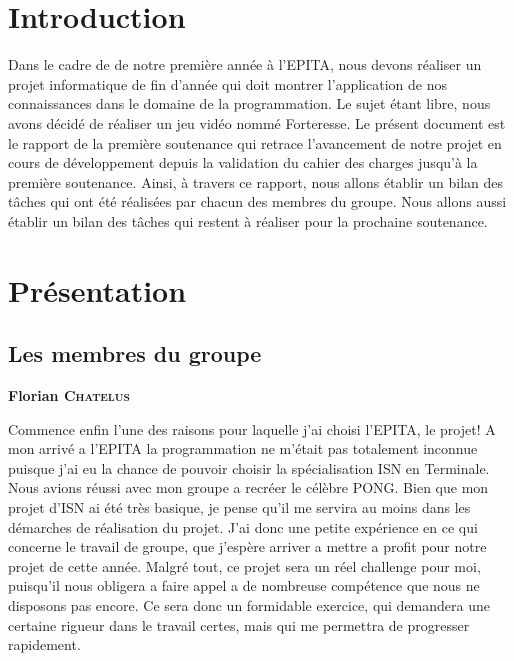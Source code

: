 \documentclass[a4paper, 12pt]{article}
\begin{document}
\begin{spacing}{1.0}
	\tableofcontents
\end{spacing}

\newpage
\section{Introduction}
Dans le cadre de de notre première année à l'EPITA, nous devons réaliser un projet informatique de fin d'année qui doit montrer l'application de nos connaissances dans le domaine de la programmation.
	Le sujet étant libre, nous avons décidé de réaliser un jeu vidéo nommé Forteresse.
	Le présent document est  le rapport de la première soutenance qui retrace l'avancement de notre projet en cours de développement depuis la validation du cahier des charges jusqu'à la première soutenance. Ainsi, à travers ce rapport, nous allons établir un bilan des tâches qui ont été réalisées par chacun des membres du groupe. Nous allons aussi établir un bilan  des tâches qui restent à  réaliser pour  la prochaine soutenance.

\newpage

\section{Présentation}
	\subsection{Les membres du groupe}
	\parindent=0cm\textbf{Florian \textsc{Chatelus}}
	\smallbreak
	\par \parindent=0.5cm Commence enfin l'une des raisons pour laquelle j'ai choisi l'EPITA, le projet! A mon arrivé a l'EPITA la programmation ne m'était pas totalement inconnue puisque j'ai eu la chance de pouvoir choisir la spécialisation ISN en Terminale. Nous avions réussi avec mon groupe a recréer le célèbre PONG. Bien que mon projet d'ISN ai été très basique, je pense qu'il me servira au moins dans les démarches de réalisation du projet. J'ai donc une petite expérience en ce qui concerne le travail de groupe, que j'espère arriver a mettre a profit pour notre projet de cette année. Malgré tout, ce projet sera un réel challenge pour moi, puisqu'il nous obligera a faire appel a de nombreuse compétence que nous ne disposons pas encore. Ce sera donc un formidable exercice, qui demandera une certaine rigueur dans le travail certes, mais qui me permettra de progresser rapidement.\\
	
\end{document}
